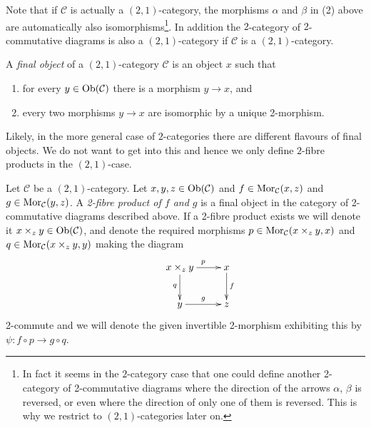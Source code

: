 Note that if $\mathcal{C}$ is actually a $(2, 1)$-category,
the morphisms $\alpha$ and $\beta$ in (2) above are automatically
also isomorphisms\footnote{In fact it seems in the $2$-category case
that one could define another 2-category of 2-commutative diagrams where
the direction of the arrows $\alpha$, $\beta$ is reversed, or even
where the direction of only one of them is reversed. This is why
we restrict to $(2, 1)$-categories later on.}.
In addition the $2$-category of
$2$-commutative diagrams is also a $(2, 1)$-category if $\mathcal{C}$ is
a $(2, 1)$-category.

\begin{definition}
\label{definition-final-object-2-category}
A {\it final object} of a $(2, 1)$-category
$\mathcal{C}$ is an object $x$ such that
\begin{enumerate}
\item for every $y \in \mathop{\mathrm{Ob}}\nolimits(\mathcal{C})$ there is a morphism $y \to x$,
and
\item every two morphisms $y \to x$ are isomorphic by a unique 2-morphism.
\end{enumerate}
\end{definition}

\noindent
Likely, in the more general case of $2$-categories there are different
flavours of final objects. We do not want to get into this and hence
we only define $2$-fibre products in the $(2, 1)$-case.

\begin{definition}
\label{definition-2-fibre-products}
Let $\mathcal{C}$ be a $(2, 1)$-category.
Let $x, y, z\in \mathop{\mathrm{Ob}}\nolimits(\mathcal{C})$ and
$f\in \mathop{\mathrm{Mor}}\nolimits_\mathcal{C}(x, z)$
and $g\in \mathop{\mathrm{Mor}}\nolimits_{\mathcal C}(y, z)$. A
{\it 2-fibre product of $f$ and $g$} is
a final object in the category of 2-commutative diagrams
described above. If a 2-fibre product exists we
will denote it $x \times_z y\in \mathop{\mathrm{Ob}}\nolimits(\mathcal{C})$, and denote the
required morphisms $p\in \mathop{\mathrm{Mor}}\nolimits_{\mathcal C}(x \times_z y, x)$ and
$q\in \mathop{\mathrm{Mor}}\nolimits_{\mathcal C}(x \times_z y, y)$ making the diagram
$$
\xymatrix{
& x \times_z y \ar[r]^{p} \ar[d]_q & x \ar[d]^{f} \\
& y \ar[r]^{g} & z }
$$
2-commute and we will denote the given invertible
2-morphism exhibiting this by $\psi : f \circ p \to g \circ q$.
\end{definition}

